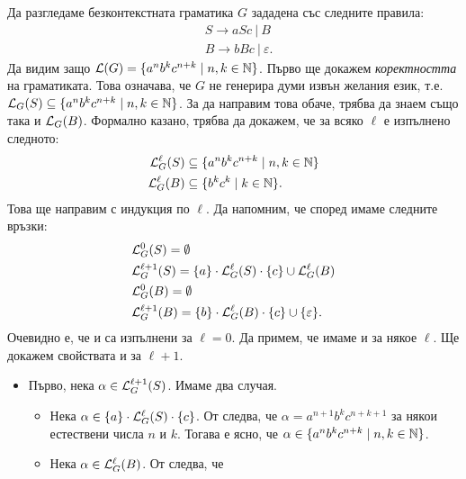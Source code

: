 \begin{extra}

\begin{example}
  Да разгледаме безконтекстната граматика $G$ зададена със следните правила:
  \begin{align*}
    & S \to aSc\ |\  B\\
    & B \to bBc\ |\ \varepsilon.
  \end{align*}
  Да видим защо $\mathcal{L}(G) = \{a^nb^kc^{n+k} \mid n,k\in\mathbb{N}\}$.
  Първо ще докажем \emph{коректността} на граматиката. Това означава, че $G$ не генерира думи извън желания език, т.е.
  $\mathcal{L}_G(S) \subseteq \{a^nb^kc^{n+k} \mid n,k\in\mathbb{N}\}$. За да направим това обаче, трябва да знаем също така и $\mathcal{L}_G(B)$.
  Формално казано, трябва да докажем, че за всяко $\ell$ е изпълнено следното:
  \begin{align}
    \mathcal{L}^\ell_G(S) & \subseteq \{a^nb^kc^{n+k} \mid n,k\in\mathbb{N}\} \label{eq:nknk1}\\
    \mathcal{L}^\ell_G(B) & \subseteq \{b^kc^k \mid k \in \mathbb{N}\} \label{eq:nknk2}.
  \end{align}
  Това ще направим с индукция по $\ell$.
  Да напомним, че според  имаме следните връзки:
  \begin{align*}
    & \mathcal{L}^0_G(S) = \emptyset\\
    & \mathcal{L}^{\ell+1}_G(S) = \{a\} \cdot \mathcal{L}^\ell_G(S) \cdot \{c\} \cup \mathcal{L}^\ell_G(B)\\
    & \mathcal{L}^0_G(B) = \emptyset\\
    & \mathcal{L}^{\ell+1}_G(B) = \{b\} \cdot \mathcal{L}^\ell_G(B) \cdot \{c\} \cup \{\varepsilon\}.
  \end{align*}
  Очевидно е, че  и  са изпълнени за $\ell = 0$.
  Да примем, че имаме  и  за някое $\ell$.
  Ще докажем свойствата и за $\ell+1$.
  \begin{itemize}
  \item
    Първо, нека $\alpha \in \mathcal{L}^{\ell+1}_G(S)$. Имаме два случая.
    \begin{itemize}
    \item
      Нека $\alpha \in \{a\} \cdot \mathcal{L}^\ell_G(S) \cdot \{c\}$. От \IndHyp следва, че
      $\alpha = a^{n+1}b^kc^{n+k+1}$ за някои естествени числа $n$ и $k$.
      Тогава е ясно, че $\alpha \in \{a^nb^kc^{n+k} \mid n,k\in\mathbb{N}\}$.
    \item
      Нека $\alpha \in  \mathcal{L}^\ell_G(B)$. От \IndHyp следва, че

\end{itemize}
\end{itemize}
\end{example}
\end{extra}
